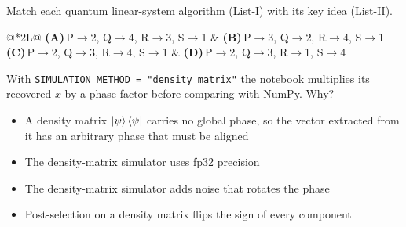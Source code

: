 \documentclass[11pt,a4paper]{article}
\newcommand{\optlabel}[1]{\textbf{(#1)}}
\newenvironment{qitem}[1]{\begin{list}{}{\setlength{\leftmargin}{3.3em}\setlength{\labelwidth}{3.1em}%
  \setlength{\labelsep}{0.2em}\setlength{\topsep}{3pt}\setlength{\parsep}{3pt}}\item[\textbf{Q.#1}\hfill]}{\end{list}}
\newcommand{\qsep}{\par\vspace{2pt}{\color{black!15}\hrule}\vspace{4pt}}
\begin{document}
\begin{qitem}{72}
Match each quantum linear-system algorithm (List-I) with its key idea (List-II).
\par\smallskip{}
\par\smallskip\noindent\begin{tabularx}{\linewidth}{@{}*{2}{L}@{}}
\optlabel{A}\,P$\to$2, Q$\to$4, R$\to$3, S$\to$1 & \optlabel{B}\,P$\to$3, Q$\to$2, R$\to$4, S$\to$1 \\[3pt]
\optlabel{C}\,P$\to$2, Q$\to$3, R$\to$4, S$\to$1 & \optlabel{D}\,P$\to$2, Q$\to$3, R$\to$1, S$\to$4
\end{tabularx}
\end{qitem}
\qsep

\begin{qitem}{73}
With \texttt{SIMULATION\_METHOD = "density\_matrix"} the notebook multiplies its recovered $x$ by a phase factor before comparing with NumPy. Why?
\begin{itemize}[leftmargin=2.6em, labelsep=0.4em, itemsep=2pt, topsep=3pt]
\item[\optlabel{A}] A density matrix $\ket\psi\bra\psi$ carries no global phase, so the vector extracted from it has an arbitrary phase that must be aligned
\item[\optlabel{B}] The density-matrix simulator uses fp32 precision
\item[\optlabel{C}] The density-matrix simulator adds noise that rotates the phase
\item[\optlabel{D}] Post-selection on a density matrix flips the sign of every component
\end{itemize}
\end{qitem}
\qsep
\end{document}
